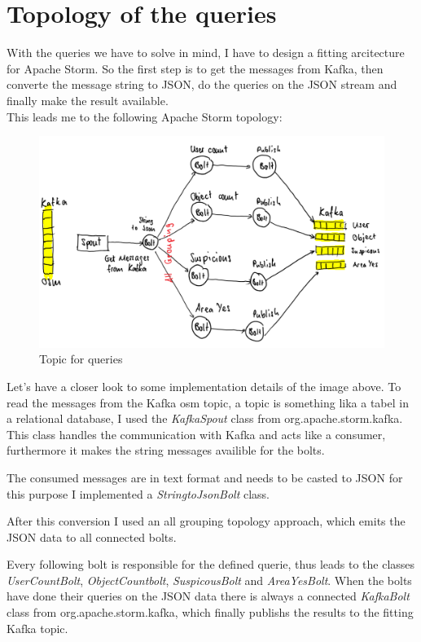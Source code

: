 \newpage
\section{Topology of the queries}
With the queries we have to solve in mind, I have to design a fitting arcitecture for Apache Storm.
So the first step is to get the messages from Kafka, then converte the message string to JSON,
do the queries on the JSON stream and finally make the result available.\\
\medskip
This leads me to the following Apache Storm topology:
\begin{figure}[H]
\centering
\captionsetup{justification=centering}
\includegraphics[width=1.0\textwidth]{images/impl_topic.png}
\caption[Topic for queries]{Topic for queries}
\end{figure}
Let's have a closer look to some implementation details of the image above.
To read the messages from the Kafka osm topic, a topic is something lika a tabel in a relational database, I used the \textit{KafkaSpout} class from org.apache.storm.kafka.
This class handles the communication with Kafka and acts like a consumer, furthermore it makes the string messages availible for the bolts.

The consumed messages are in text format and needs to be casted to JSON for this purpose I implemented a \textit{StringtoJsonBolt} class.

After this conversion I used an all grouping topology approach, which emits the JSON data to all connected bolts.

Every following bolt is responsible for the defined querie, thus leads to the classes \textit{UserCountBolt}, \textit{ObjectCountbolt}, \textit{SuspicousBolt} and \textit{AreaYesBolt}.
When the bolts have done their queries on the JSON data there is always a connected \textit{KafkaBolt} class from org.apache.storm.kafka,
which finally publishs the results to the fitting Kafka topic.

